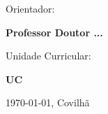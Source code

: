 \vspace{0.35cm}
\begin{center}
\begin{normalsize}
\begin{large}
Orientador:
\end{large}
\end{normalsize}
\end{center}

\vspace{0.15cm}
\begin{center}
\begin{large}
\textbf{Professor Doutor ...}
\end{large}
\end{center}

\vspace{0.35cm}
\begin{center}
\begin{normalsize}
\begin{large}
Unidade Curricular:
\end{large}
\end{normalsize}
\end{center}

\vspace{0.15cm}
\begin{center}
\begin{large}
\textbf{UC}
\end{large}
\end{center}

\vspace{0.05cm}
\begin{center}
\begin{normalsize}
\today, Covilhã
\end{normalsize}
\end{center}

